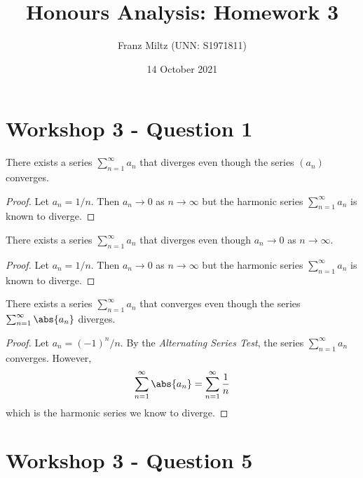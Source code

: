 \documentclass{article}
\begin{document}
\title{Honours Analysis: Homework 3}
\author{Franz Miltz (UNN: S1971811)}
\date{14 October 2021}
\maketitle

\section{Workshop 3 - Question 1}

\begin{claim}
   There exists a series $\sum_{n=1}^\infty a_n$ that diverges even though the 
   series $(a_n)$ converges.
\end{claim}
\begin{proof}
   Let $a_n=1/n$. Then $a_n\to 0$ as $n\to\infty$ but the harmonic series 
   $\sum_{n=1}^\infty a_n$ is known to diverge.
\end{proof}

\begin{claim}
   There exists a series $\sum_{n=1}^\infty a_n$ that diverges even though
   $a_n\to 0$ as $n\to\infty$.
\end{claim}
\begin{proof}
   Let $a_n=1/n$. Then $a_n\to 0$ as $n\to\infty$ but the harmonic series 
   $\sum_{n=1}^\infty a_n$ is known to diverge.
\end{proof}

\begin{claim}
   There exists a series $\sum_{n=1}^\infty a_n$ that converges even though
   the series $\sum_{n=1}^\infty \abs{a_n}$ diverges.
\end{claim}
\begin{proof}
   Let $a_n=(-1)^n/n$. By the \emph{Alternating Series Test}, the series $\sum_{n=1}^\infty a_n$
   converges. However, 
   \begin{align}
      \sum_{n=1}^\infty \abs{a_n} = \sum_{n=1}^\infty \frac{1}{n}
   \end{align}
   which is the harmonic series we know to diverge.
\end{proof}

\section{Workshop 3 - Question 5}
\end{document}
